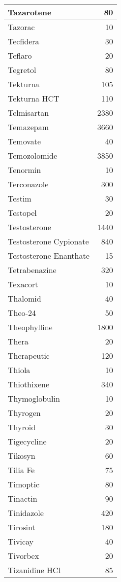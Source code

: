 \documentclass[
]{article}
\begin{document}
\begin{table}
\begin{tabular}[t]{l|r}
Tazarotene & 80\\
\hline
Tazorac & 10\\
\hline
Tecfidera & 30\\
\hline
Teflaro & 20\\
\hline
Tegretol & 80\\
\hline
Tekturna & 105\\
\hline
Tekturna HCT & 110\\
\hline
Telmisartan & 2380\\
\hline
Temazepam & 3660\\
\hline
Temovate & 40\\
\hline
Temozolomide & 3850\\
\hline
Tenormin & 10\\
\hline
Terconazole & 300\\
\hline
Testim & 30\\
\hline
Testopel & 20\\
\hline
Testosterone & 1440\\
\hline
Testosterone Cypionate & 840\\
\hline
Testosterone Enanthate & 15\\
\hline
Tetrabenazine & 320\\
\hline
Texacort & 10\\
\hline
Thalomid & 40\\
\hline
Theo-24 & 50\\
\hline
Theophylline & 1800\\
\hline
Thera & 20\\
\hline
Therapeutic & 120\\
\hline
Thiola & 10\\
\hline
Thiothixene & 340\\
\hline
Thymoglobulin & 10\\
\hline
Thyrogen & 20\\
\hline
Thyroid & 30\\
\hline
Tigecycline & 20\\
\hline
Tikosyn & 60\\
\hline
Tilia Fe & 75\\
\hline
Timoptic & 80\\
\hline
Tinactin & 90\\
\hline
Tinidazole & 420\\
\hline
Tirosint & 180\\
\hline
Tivicay & 40\\
\hline
Tivorbex & 20\\
\hline
Tizanidine HCl & 85\\

\end{tabular}
\end{table}
\end{document}
